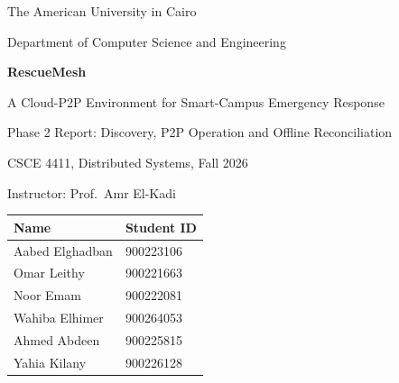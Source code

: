 \documentclass[10pt,a4paper]{article}
\begin{document}
\begin{titlepage}
  \centering
  \vspace*{0.2cm}
  {\large The American University in Cairo\par}
  {\normalsize Department of Computer Science and Engineering\par}
  \vspace{1.1cm}
  {\Huge\bfseries RescueMesh\par}
  \vspace{0.3cm}
  {\Large A Cloud-P2P Environment for Smart-Campus Emergency Response\par}
  \vspace{0.4cm}
  {\Large Phase 2 Report: Discovery, P2P Operation and Offline Reconciliation\par}
  \vspace{0.8cm}
  {\large CSCE 4411, Distributed Systems, Fall 2026\par}
  {\large Instructor: Prof.\ Amr El-Kadi\par}
  \vspace{0.8cm}
  \begin{tabular}{@{}ll@{}}
    \toprule
    Name & Student ID \\
    \midrule
    Aabed Elghadban & 900223106 \\
    Omar Leithy & 900221663 \\
    Noor Emam & 900222081 \\
    Wahiba Elhimer & 900264053 \\
    Ahmed Abdeen & 900225815 \\
    Yahia Kilany & 900226128 \\
    \bottomrule
  \end{tabular}
  \vspace{1.0cm}


\end{titlepage}
\end{document}

